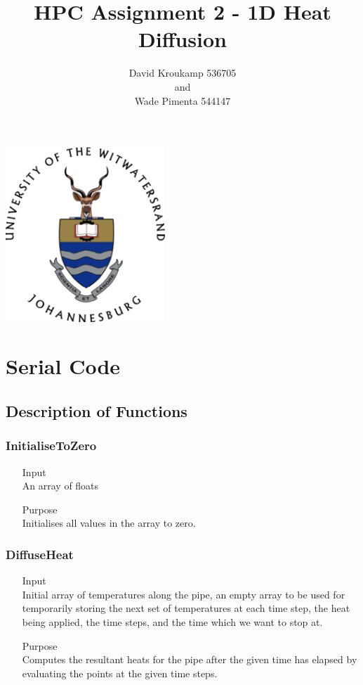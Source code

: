 \documentclass[11pt,a4paper]{article}
\author{David Kroukamp 536705\\and\\Wade Pimenta 544147}
\title{HPC Assignment 2 - 1D Heat Diffusion}
\begin{document}
\null  %
\nointerlineskip  %
\vfill
\let\snewpage \newpage
\let\newpage \relax
\begin{center}
	\includegraphics[width=6cm]{logo.png}
\end{center}

\maketitle
\let \newpage \snewpage
\vfill 
\break %

\newpage
\tableofcontents
\newpage
\section{Serial Code}
\subsection{Description of Functions}
\subsubsection{InitialiseToZero}
\begin{itemize}
	\item[Input] \hfill\\
	An array of floats
	\item[Purpose] \hfill\\
	Initialises all values in the array to zero.
\end{itemize}

\subsubsection{DiffuseHeat}
\begin{itemize}
	\item[Input] \hfill\\
	Initial array of temperatures along the pipe, an empty array to be used for temporarily storing the next set of temperatures at each time step, the heat being applied, the time steps, and the time which we want to stop at.
	\item[Purpose] \hfill\\
	Computes the resultant heats for the pipe after the given time has elapsed by evaluating the points at the given time steps.
\end{itemize}
\end{document}
